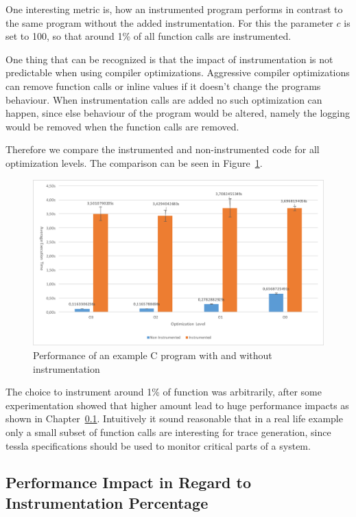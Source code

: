One interesting metric is, how an instrumented program performs in contrast to the same program without the added instrumentation.
For this the parameter \(c\) is set to 100, so that around 1\% of all function calls are instrumented.

One thing that can be recognized is that the impact of instrumentation is not predictable when using compiler optimizations.
Aggressive compiler optimizations can remove function calls or inline values if it doesn't change the programs behaviour.
When instrumentation calls are added no such optimization can happen, since else behaviour of the program would be altered, namely the logging would be removed when the function calls are removed.

Therefore we compare the instrumented and non-instrumented code for all optimization levels.
The comparison can be seen in Figure~\ref{fig:chap_eval:instrument_benchmark_results}.

\begin{figure}
  \includegraphics[angle=90,origin=c,width=\textwidth]{gfx/instrumentation_benchmark}
  \caption{Performance of an example C program with and without instrumentation}
\label{fig:chap_eval:instrument_benchmark_results}
\end{figure}

The choice to instrument around 1\% of function was arbitrarily, after some experimentation showed that higher amount lead to huge performance impacts as shown in Chapter~\ref{sec:evaluation:instrumentation_benchmark:instr_amount}.
Intuitively it sound reasonable that in a real life example only a small subset of function calls are interesting for trace generation, since \gls{tessla} specifications should be used to monitor critical parts of a system.

\subsection{Performance Impact in Regard to Instrumentation Percentage}
\label{sec:evaluation:instrumentation_benchmark:instr_amount}

